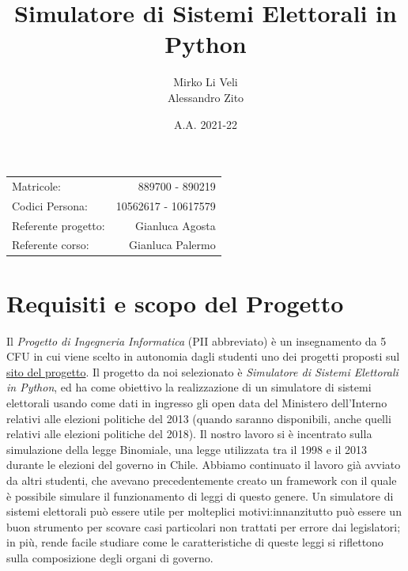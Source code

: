 \documentclass{article}
\title{Simulatore di Sistemi Elettorali in Python} %
\author{Mirko Li Veli \\ Alessandro Zito} %
\date{A.A. 2021-22}
\begin{document}
\maketitle %
\begin{center}
\begin{tabular}{l r}
Matricole: & 889700 - 890219\\ %
Codici Persona: & 10562617 - 10617579\\
Referente progetto: & Gianluca Agosta\\
Referente corso: & Gianluca Palermo %
\end{tabular}
\end{center}

\newpage

\tableofcontents

\newpage







\section{Requisiti e scopo del Progetto}

Il \textit{Progetto di Ingegneria Informatica} (PII abbreviato) è un insegnamento da 5 CFU in cui viene scelto in autonomia dagli studenti uno dei progetti proposti sul \href{https://pii.dei.polimi.it/}{sito del progetto}.
Il progetto da noi selezionato è \textit{Simulatore di Sistemi Elettorali in Python}, ed ha come obiettivo la realizzazione di un simulatore di sistemi elettorali usando come dati in ingresso gli open data del Ministero dell’Interno relativi alle elezioni politiche del 2013 (quando saranno disponibili, anche quelli relativi alle elezioni politiche del 2018). Il nostro lavoro si è incentrato sulla simulazione della legge Binomiale, una legge utilizzata tra il 1998 e il 2013 durante le elezioni del governo in Chile. Abbiamo continuato il lavoro già avviato da altri studenti, che avevano precedentemente creato un framework con il quale è possibile simulare il funzionamento di leggi di questo genere.
Un simulatore di sistemi elettorali può essere utile per molteplici motivi:innanzitutto può essere un buon strumento per scovare casi particolari non trattati per errore dai legislatori; in più, rende facile
studiare come le caratteristiche di queste leggi si riflettono sulla composizione degli organi di governo.
\end{document}
